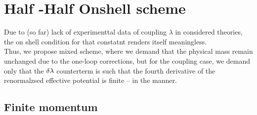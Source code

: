 \chapter{Half \MSbar-Half Onshell scheme}
Due to (so far) lack of experimenttal data of coupling $\lambda$ in considered theories, 
the on shell condition for that constatnt renders itself meaningless. \\
Thus, we propose mixed scheme, where we demand that the physical mass remain unchanged due to 
the one-loop corrections, but for the coupling case, we demand only that the $\delta\lambda$ 
counterterm is such that the fourth  derivative of the renormalzsed effective potential is finite 
-- in the \MSbar manner.
\section{Finite momentum}

